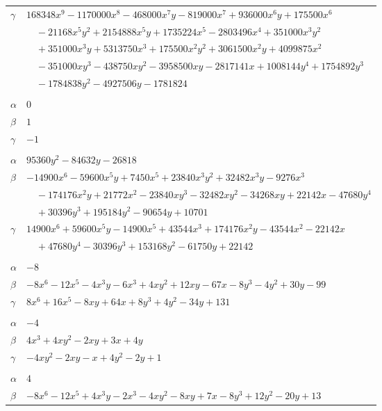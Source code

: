\documentclass[11pt]{article}
\begin{document}
\begin{longtable}{@{}ll@{}}
$\gamma$ & $168348x^{9}-1170000x^{8}-468000x^{7}y-819000x^{7}+936000x^{6}y+175500x^{6}$\\
 & $\quad -21168x^{5}y^{2}+2154888x^{5}y+1735224x^{5}-2803496x^{4}+351000x^{3}y^{2}$\\
 & $\quad +351000x^{3}y+5313750x^{3}+175500x^{2}y^{2}+3061500x^{2}y+4099875x^{2}$\\
 & $\quad -351000xy^{3}-438750xy^{2}-3958500xy-2817141x+1008144y^{4}+1754892y^{3}$\\
 & $\quad -1784838y^{2}-4927506y-1781824$\\
\addlinespace[3pt]
\multicolumn{2}{@{}l}{$\{i,j\}=\{25,28\}$, $k_{ij}=2$}\\
$\alpha$ & $0$\\
$\beta$ & $1$\\
$\gamma$ & $-1$\\
\addlinespace[3pt]
\multicolumn{2}{@{}l}{$\{i,j\}=\{25,39\}$, $k_{ij}=2^{6}\cdot 3^{2}\cdot 5\cdot 17$}\\
$\alpha$ & $95360y^{2}-84632y-26818$\\
$\beta$ & $-14900x^{6}-59600x^{5}y+7450x^{5}+23840x^{3}y^{2}+32482x^{3}y-9276x^{3}$\\
 & $\quad -174176x^{2}y+21772x^{2}-23840xy^{3}-32482xy^{2}-34268xy+22142x-47680y^{4}$\\
 & $\quad +30396y^{3}+195184y^{2}-90654y+10701$\\
$\gamma$ & $14900x^{6}+59600x^{5}y-14900x^{5}+43544x^{3}+174176x^{2}y-43544x^{2}-22142x$\\
 & $\quad +47680y^{4}-30396y^{3}+153168y^{2}-61750y+22142$\\
\addlinespace[3pt]
\multicolumn{2}{@{}l}{$\{i,j\}=\{26,31\}$, $k_{ij}=2\cdot 7\cdot 17$}\\
$\alpha$ & $-8$\\
$\beta$ & $-8x^{6}-12x^{5}-4x^{3}y-6x^{3}+4xy^{2}+12xy-67x-8y^{3}-4y^{2}+30y-99$\\
$\gamma$ & $8x^{6}+16x^{5}-8xy+64x+8y^{3}+4y^{2}-34y+131$\\
\addlinespace[3pt]
\multicolumn{2}{@{}l}{$\{i,j\}=\{26,33\}$, $k_{ij}=3$}\\
$\alpha$ & $-4$\\
$\beta$ & $4x^{3}+4xy^{2}-2xy+3x+4y$\\
$\gamma$ & $-4xy^{2}-2xy-x+4y^{2}-2y+1$\\
\addlinespace[3pt]
\multicolumn{2}{@{}l}{$\{i,j\}=\{26,34\}$, $k_{ij}=1$}\\
$\alpha$ & $4$\\
$\beta$ & $-8x^{6}-12x^{5}+4x^{3}y-2x^{3}-4xy^{2}-8xy+7x-8y^{3}+12y^{2}-20y+13$\\

\end{longtable}
\end{document}
